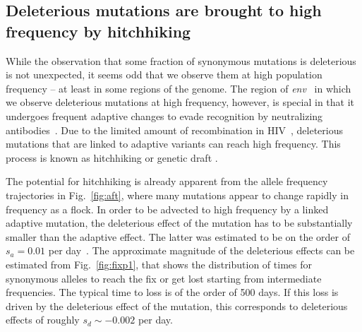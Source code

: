 \documentclass[rmp, twocolumn]{revtex4}
\newcommand{\FIG}[1]{Fig.~\ref{fig:#1}}
\newcommand{\env}{\textit{env}}
\begin{document}
\subsection{Deleterious mutations are brought to high frequency by hitchhiking}
While the observation that some fraction of synonymous mutations is deleterious
is not unexpected, it seems odd that we observe them at high population
frequency -- at least in some regions of the genome. The region of \env~ in
which we observe deleterious mutations at high frequency, however, is special in
that it undergoes frequent adaptive changes to evade recognition by neutralizing
antibodies~\cite{williamson_adaptation_2003,richman_rapid_2003}. Due to the limited amount of
recombination in HIV~\cite{neher_recombination_2010,batorsky_estimate_2011},
deleterious mutations that are linked to adaptive variants can reach high
frequency. This process is known as hitchhiking \citep{smith_hitch-hiking_1974}
or genetic draft \citep{gillespie_genetic_2000,neher_genetic_2011}.

The potential for hitchhiking is already apparent from the allele frequency
trajectories in \FIG{aft}, where many mutations appear to change rapidly in
frequency as a flock. In order
to be advected to high frequency by a linked adaptive mutation, the deleterious
effect of the mutation has to be substantially smaller than the adaptive effect.
The latter was estimated to be on the order of $s_a = 0.01$ per day~\citep{neher_recombination_2010}.
The approximate magnitude of the deleterious effects can be estimated from
\FIG{fixp1}, that shows the distribution of times for synonymous
alleles to reach the fix or get lost starting from intermediate frequencies. The
typical time to loss is of the order of 500 days. If this loss is driven by the
deleterious effect of the mutation, this corresponds to deleterious effects of
roughly $s_d \sim - 0.002$ per day.
\end{document}
